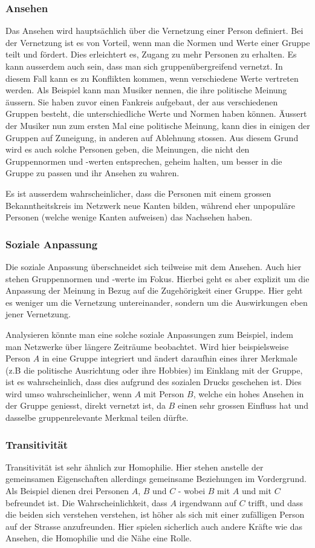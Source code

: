 \subsubsection{Ansehen}
Das Ansehen wird hauptsächlich über die Vernetzung einer Person definiert. Bei der Vernetzung ist es von Vorteil, wenn
man die Normen und Werte einer Gruppe teilt und fördert. Dies erleichtert es, Zugang zu mehr Personen zu erhalten. Es
kann ausserdem auch sein, dass man sich gruppenübergreifend vernetzt. In diesem Fall kann es zu Konflikten kommen, wenn
verschiedene Werte vertreten werden. Als Beispiel kann man Musiker nennen, die ihre politische Meinung äussern. Sie
haben zuvor einen Fankreis aufgebaut, der aus verschiedenen Gruppen besteht, die unterschiedliche Werte und Normen
haben können. Äussert der Musiker nun zum ersten Mal eine politische Meinung, kann dies in einigen der Gruppen auf
Zuneigung, in anderen auf Ablehnung stossen. Aus diesem Grund wird es auch solche Personen geben, die Meinungen, die
nicht den Gruppennormen und -werten entsprechen, geheim halten, um besser in die Gruppe zu passen und ihr Ansehen zu wahren.

Es ist ausserdem wahrscheinlicher, dass die Personen mit einem grossen Bekanntheitskreis im Netzwerk neue Kanten bilden, während eher
unpopuläre Personen (welche wenige Kanten aufweisen) das Nachsehen haben.

\subsubsection{Soziale Anpassung}
Die soziale Anpassung überschneidet sich teilweise mit dem Ansehen. Auch hier stehen Gruppennormen und -werte im Fokus. Hierbei
geht es aber explizit um die Anpassung der Meinung in Bezug auf die Zugehörigkeit einer Gruppe. Hier geht es weniger
um die Vernetzung untereinander, sondern um die Auswirkungen eben jener Vernetzung.

Analysieren könnte man eine solche soziale Anpassungen zum Beispiel, indem man Netzwerke über längere Zeiträume
beobachtet. Wird hier beispielsweise Person $A$ in eine Gruppe integriert und ändert daraufhin eines ihrer Merkmale
(z.B die politische Ausrichtung oder ihre Hobbies) im Einklang mit der Gruppe, ist es
wahrscheinlich, dass dies aufgrund des sozialen Drucks geschehen ist.
Dies wird umso wahrscheinlicher, wenn $A$ mit Person $B$,
welche ein hohes Ansehen in der Gruppe geniesst, direkt vernetzt ist, da $B$ einen sehr grossen Einfluss hat und dasselbe
gruppenrelevante Merkmal teilen dürfte.

\subsubsection{Transitivität}
Transitivität ist sehr ähnlich zur Homophilie. Hier stehen anstelle der gemeinsamen Eigenschaften allerdings gemeinsame Beziehungen im Vordergrund.
Als Beispiel dienen drei Personen $A$, $B$ und $C$ - wobei $B$ mit $A$ und mit $C$ befreundet ist.
Die Wahrscheinlichkeit, dass $A$ irgendwann auf $C$ trifft, und dass die beiden sich verstehen verstehen, ist höher als sich mit einer zufälligen Person auf
der Strasse anzufreunden. Hier spielen sicherlich auch andere Kräfte wie das Ansehen, die Homophilie und die Nähe eine Rolle.

